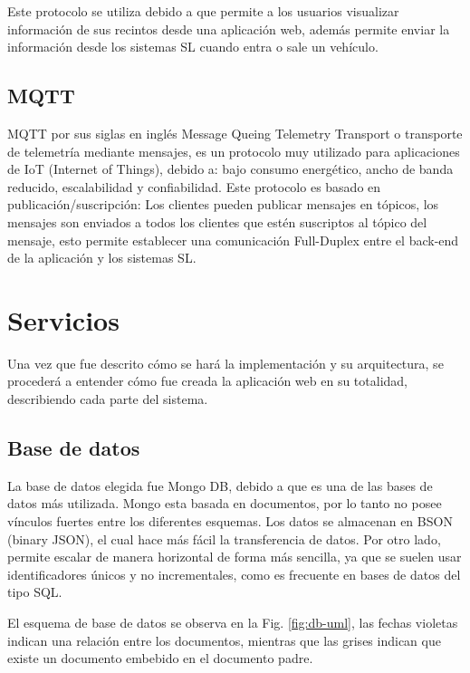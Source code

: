 Este protocolo se utiliza debido a que permite  a los usuarios visualizar información de sus recintos desde una aplicación web, además permite enviar la información desde los sistemas SL cuando entra o sale un vehículo.

\subsection{MQTT}

MQTT por sus siglas en inglés Message Queing Telemetry Transport o transporte de telemetría mediante mensajes,
es un protocolo muy utilizado para aplicaciones de IoT (Internet of Things), debido a: bajo consumo energético, ancho de banda reducido, escalabilidad y confiabilidad.
Este protocolo es basado en publicación/suscripción: Los clientes pueden publicar mensajes en tópicos, los mensajes son enviados a todos los clientes que estén suscriptos al tópico del mensaje, esto permite establecer una comunicación Full-Duplex entre el back-end de la aplicación y los sistemas SL.

\section{Servicios}

Una vez que fue descrito cómo se hará la implementación y su arquitectura, se procederá a entender cómo fue creada la aplicación web en su totalidad, describiendo cada parte del sistema.

\subsection{Base de datos}

La base de datos elegida fue Mongo DB, debido a que es una de las bases de datos más utilizada. Mongo esta basada en documentos, por lo tanto no posee vínculos fuertes entre los diferentes esquemas.
Los datos se almacenan en BSON (binary JSON), el cual hace más fácil la transferencia de datos. Por otro lado, permite escalar de manera horizontal de forma más sencilla, ya que se suelen usar identificadores únicos y no incrementales, como es frecuente en bases de datos del tipo SQL.

El esquema de base de datos se observa en la Fig. \ref{fig:db-uml}, las fechas violetas indican una relación entre los documentos, mientras que las grises indican que existe un documento embebido en el documento padre.

